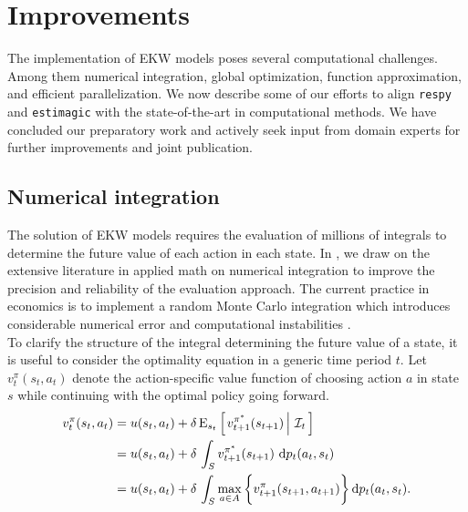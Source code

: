 \section{Improvements}\label{Computation}
The implementation of EKW models poses several computational challenges. Among them numerical integration, global optimization, function approximation, and efficient parallelization. We now describe some of our efforts to align \verb+respy+ and \verb+estimagic+ with the state-of-the-art in computational methods. We have concluded our preparatory work and actively seek input from domain experts for further improvements and joint publication.
\subsection{Numerical integration}
The solution of EKW models requires the evaluation of millions of integrals to determine the future value of each action in each state. In \citet{Gabler.2020a}, we draw on the extensive literature in applied math on numerical integration \citep{Davis.2007, Gerstner.1998} to improve the precision and reliability of the evaluation approach. The current practice in economics is to implement a random Monte Carlo integration which introduces considerable numerical error and computational instabilities \citep{Judd.2011}.\\

\noindent To clarify the structure of the integral determining the future value of a state, it is useful to consider the optimality equation in a generic time period $t$. Let $v^{\pi}_{t}(s_t, a_t)$ denote the action-specific value function of choosing action $a$ in state $s$ while continuing with the optimal policy going forward.
%
\begin{align*}
v^{\pi}_{t}(s_t, a_t) & = u(s_t, a_t) + \delta\,\mathrm{E}_{s_t} \left[\left.v^{\pi^*}_{t + 1}(s_{t + 1})\,\right\vert\,\mathcal{I}_t\,\right] \\
& =  u(s_t, a_t) + \delta\, \int_S v^{\pi^*}_{t + 1}(s_{t + 1})\, \mathop{}\!\mathrm{d} p_t(a_t, s_t)\\
& =  u(s_t, a_t) + \delta\, \int_S \max_{a \in A}\bigg\{v^\pi_{t + 1}(s_{t + 1}, a_{t + 1})\bigg\}\mathop{}\!\mathrm{d} p_t(a_t, s_t).
\end{align*}

